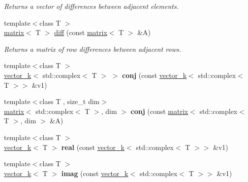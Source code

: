 \begin{DoxyCompactItemize}
\begin{DoxyCompactList}\small\item\em Returns a vector of differences between adjacent elements. \end{DoxyCompactList}\item 
{\footnotesize template$<$class T $>$ }\\\hyperlink{classkeycpp_1_1matrix}{matrix}$<$ T $>$ \hyperlink{namespacekeycpp_abb4e57814fd30b7b8d4845bbc16c73e9}{diff} (const \hyperlink{classkeycpp_1_1matrix}{matrix}$<$ T $>$ \&A)
\begin{DoxyCompactList}\small\item\em Returns a matrix of row differences between adjacent rows. \end{DoxyCompactList}\item 
\hypertarget{namespacekeycpp_a436cfe206bb34dfe613ac495e792b155}{{\footnotesize template$<$class T $>$ }\\\hyperlink{classkeycpp_1_1vector__k}{vector\-\_\-k}$<$ std\-::complex$<$ T $>$ $>$ {\bfseries conj} (const \hyperlink{classkeycpp_1_1vector__k}{vector\-\_\-k}$<$ std\-::complex$<$ T $>$$>$ \&v1)}\label{namespacekeycpp_a436cfe206bb34dfe613ac495e792b155}

\item 
\hypertarget{namespacekeycpp_a422c63d9cf20e676efbcefd445698aca}{{\footnotesize template$<$class T , size\-\_\-t dim$>$ }\\\hyperlink{classkeycpp_1_1matrix}{matrix}$<$ std\-::complex$<$ T $>$, dim $>$ {\bfseries conj} (const \hyperlink{classkeycpp_1_1matrix}{matrix}$<$ std\-::complex$<$ T $>$, dim $>$ \&A)}\label{namespacekeycpp_a422c63d9cf20e676efbcefd445698aca}

\item 
\hypertarget{namespacekeycpp_afb8f2e43eea5a213e424a068054c2f63}{{\footnotesize template$<$class T $>$ }\\\hyperlink{classkeycpp_1_1vector__k}{vector\-\_\-k}$<$ T $>$ {\bfseries real} (const \hyperlink{classkeycpp_1_1vector__k}{vector\-\_\-k}$<$ std\-::complex$<$ T $>$$>$ \&v1)}\label{namespacekeycpp_afb8f2e43eea5a213e424a068054c2f63}

\item 
\hypertarget{namespacekeycpp_a1b8755f394a54bc0255a526c5e870e28}{{\footnotesize template$<$class T $>$ }\\\hyperlink{classkeycpp_1_1vector__k}{vector\-\_\-k}$<$ T $>$ {\bfseries imag} (const \hyperlink{classkeycpp_1_1vector__k}{vector\-\_\-k}$<$ std\-::complex$<$ T $>$$>$ \&v1)}\label{namespacekeycpp_a1b8755f394a54bc0255a526c5e870e28}


\end{DoxyCompactItemize}
